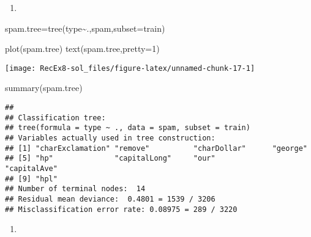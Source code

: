 \documentclass[
]{article}
\newenvironment{Shaded}{\begin{snugshade}}{\end{snugshade}}
\newcommand{\AttributeTok}[1]{\textcolor[rgb]{0.77,0.63,0.00}{#1}}
\newcommand{\DecValTok}[1]{\textcolor[rgb]{0.00,0.00,0.81}{#1}}
\newcommand{\FunctionTok}[1]{\textcolor[rgb]{0.00,0.00,0.00}{#1}}
\newcommand{\NormalTok}[1]{#1}
\newcommand{\OtherTok}[1]{\textcolor[rgb]{0.56,0.35,0.01}{#1}}
\newcommand{\SpecialCharTok}[1]{\textcolor[rgb]{0.00,0.00,0.00}{#1}}
\newcommand{\StringTok}[1]{\textcolor[rgb]{0.31,0.60,0.02}{#1}}
\providecommand{\tightlist}{%
  \setlength{\itemsep}{0pt}\setlength{\parskip}{0pt}}
\begin{document}
\begin{enumerate}
\def\labelenumi{\alph{enumi})}
\setcounter{enumi}{2}
\tightlist
\item
\end{enumerate}

\begin{Shaded}
\begin{Highlighting}[]
\NormalTok{spam.tree}\OtherTok{=}\FunctionTok{tree}\NormalTok{(type}\SpecialCharTok{\textasciitilde{}}\NormalTok{.,spam,}\AttributeTok{subset=}\NormalTok{train)}

\FunctionTok{plot}\NormalTok{(spam.tree)}
\FunctionTok{text}\NormalTok{(spam.tree,}\AttributeTok{pretty=}\DecValTok{1}\NormalTok{)}
\end{Highlighting}
\end{Shaded}

\texttt{[image: RecEx8-sol\_files/figure-latex/unnamed-chunk-17-1]}

\begin{Shaded}
\begin{Highlighting}[]
\FunctionTok{summary}\NormalTok{(spam.tree)}
\end{Highlighting}
\end{Shaded}

\begin{verbatim}
## 
## Classification tree:
## tree(formula = type ~ ., data = spam, subset = train)
## Variables actually used in tree construction:
## [1] "charExclamation" "remove"          "charDollar"      "george"         
## [5] "hp"              "capitalLong"     "our"             "capitalAve"     
## [9] "hpl"            
## Number of terminal nodes:  14 
## Residual mean deviance:  0.4801 = 1539 / 3206 
## Misclassification error rate: 0.08975 = 289 / 3220
\end{verbatim}

\begin{enumerate}
\def\labelenumi{\alph{enumi})}
\setcounter{enumi}{3}
\tightlist
\item
\end{enumerate}

\begin{Shaded}
\end{Shaded}
\end{document}
